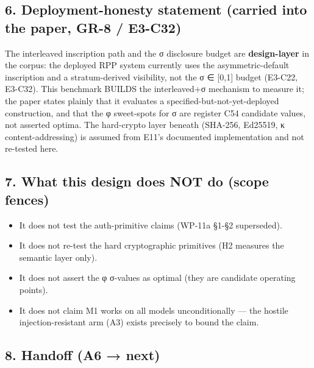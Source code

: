 \documentclass[
  11pt,
]{article}
\providecommand{\tightlist}{%
  \setlength{\itemsep}{0pt}\setlength{\parskip}{0pt}}
\begin{document}
\subsection{6. Deployment-honesty statement (carried into the paper,
GR-8 /
E3-C32)}\label{deployment-honesty-statement-carried-into-the-paper-gr-8-e3-c32}

The interleaved inscription path and the σ disclosure budget are
\textbf{design-layer} in the corpus: the deployed RPP system currently
uses the asymmetric-default inscription and a stratum-derived
visibility, not the σ ∈ {[}0,1{]} budget (E3-C22, E3-C32). This
benchmark BUILDS the interleaved+σ mechanism to measure it; the paper
states plainly that it evaluates a specified-but-not-yet-deployed
construction, and that the φ sweet-spots for σ are register C54
candidate values, not asserted optima. The hard-crypto layer beneath
(SHA-256, Ed25519, κ content-addressing) is assumed from E11's
documented implementation and not re-tested here.

\subsection{7. What this design does NOT do (scope
fences)}\label{what-this-design-does-not-do-scope-fences}

\begin{itemize}
\tightlist
\item
  It does not test the auth-primitive claims (WP-11a §1-§2 superseded).
\item
  It does not re-test the hard cryptographic primitives (H2 measures the
  semantic layer only).
\item
  It does not assert the φ σ-values as optimal (they are candidate
  operating points).
\item
  It does not claim M1 works on all models unconditionally --- the
  hostile injection-resistant arm (A3) exists precisely to bound the
  claim.
\end{itemize}

\subsection{8. Handoff (A6 → next)}\label{handoff-a6-next}
\end{document}
